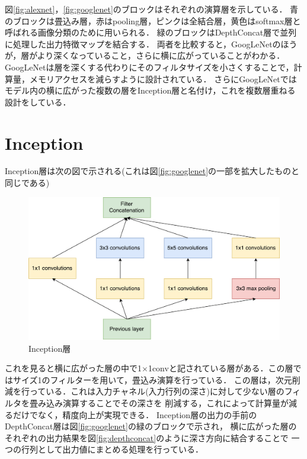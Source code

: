 {図\ref{fig:alexnet}，\ref{fig:googlenet}のブロックはそれぞれの演算層を示している．
青のブロックは畳込み層，赤はpooling層，ピンクは全結合層，黄色はsoftmax層と呼ばれる画像分類のために用いられる．
緑のブロックはDepthConcat層で並列に処理した出力特徴マップを結合する．
両者を比較すると，GoogLeNetのほうが，層がより深くなっていること，さらに横に広がっていることがわかる．
GoogLeNetは層を深くする代わりにそのフィルタサイズを小さくすることで，計算量，メモリアクセスを減らすように設計されている．
さらにGoogLeNetではモデル内の横に広がった複数の層をInception層と名付け，これを複数層重ねる設計をしている．

\section{Inception}
\label{sec:inception}
Inception層は次の図で示される(これは図\ref{fig:googlenet}の一部を拡大したものと同じである)

\begin{figure}[h]
  \centering
  \includegraphics[scale=0.5]{./chap2/fig/inception.pdf}
  \caption{Inception層}
  \label{fig:inception}
\end{figure}

これを見ると横に広がった層の中で1$\times$1convと記されている層がある．この層ではサイズ1のフィルターを用いて，畳込み演算を行っている．
この層は，次元削減を行っている．これは入力チャネル(入力行列の深さ)に対して少ない層のフィルタを畳み込み演算することでその深さを
削減する，これによって計算量が減るだけでなく，精度向上が実現できる．
Inception層の出力の手前のDepthConcat層は図\ref{fig:googlenet}の緑のブロックで示され，
横に広がった層のそれぞれの出力結果を図\ref{fig:depthconcat}のように深さ方向に結合することで
一つの行列として出力値にまとめる処理を行っている．

}
